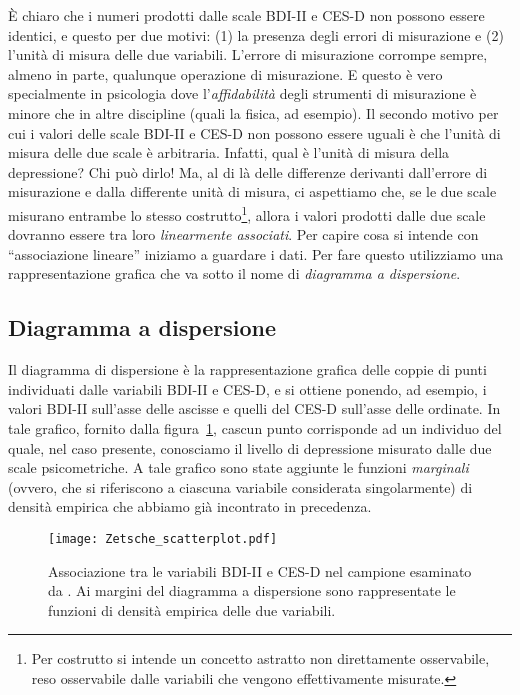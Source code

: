 È chiaro che i numeri prodotti dalle scale BDI-II e CES-D non possono essere identici, e questo per due motivi: (1) la presenza degli errori di misurazione e (2) l'unità di misura delle due variabili.
L'errore di misurazione corrompe sempre, almeno in parte, qualunque operazione di misurazione. 
E questo è vero specialmente in psicologia dove l'\emph{affidabilità} degli strumenti di misurazione è minore che in altre discipline (quali la fisica, ad esempio).
Il secondo motivo per cui i valori delle scale BDI-II e CES-D non possono essere uguali è che l'unità di misura delle due scale è arbitraria.
Infatti, qual è l'unità di misura della depressione?  
Chi può dirlo!
Ma, al di là delle differenze derivanti dall'errore di misurazione e dalla differente unità di misura, ci aspettiamo che, se le due scale misurano entrambe lo stesso costrutto\footnote{
Per costrutto si intende un concetto astratto non direttamente osservabile, reso osservabile dalle variabili che vengono effettivamente misurate.
}, allora i valori prodotti dalle due scale dovranno essere tra loro \emph{linearmente associati}. 
Per capire cosa si intende con ``associazione lineare'' iniziamo a guardare i dati.
Per fare questo utilizziamo una rappresentazione grafica che va sotto il nome di \emph{diagramma a dispersione}.

\subsection{Diagramma a dispersione}

Il diagramma di dispersione è la rappresentazione grafica delle coppie di punti  individuati dalle variabili BDI-II e CES-D, e si ottiene ponendo, ad esempio, i valori BDI-II sull'asse delle ascisse e quelli del CES-D sull'asse delle ordinate. 
In tale grafico, fornito dalla figura~\ref{fig:Zetsche_scatterplot}, cascun punto corrisponde ad un individuo del quale, nel caso presente, conosciamo il livello di depressione misurato dalle due scale psicometriche.
A tale grafico sono state aggiunte le funzioni \emph{marginali} (ovvero, che si riferiscono a ciascuna variabile considerata singolarmente) di densità empirica che abbiamo già incontrato in precedenza. 

\begin{figure}
 \centering
 \texttt{[image: Zetsche\_scatterplot.pdf]}
 \caption{Associazione tra le variabili BDI-II e CES-D nel campione esaminato da \citet{zetsche_future_2019}. Ai margini del diagramma a dispersione sono rappresentate le funzioni di densità empirica delle due variabili.}
 \label{fig:Zetsche_scatterplot}
 \end{figure}

